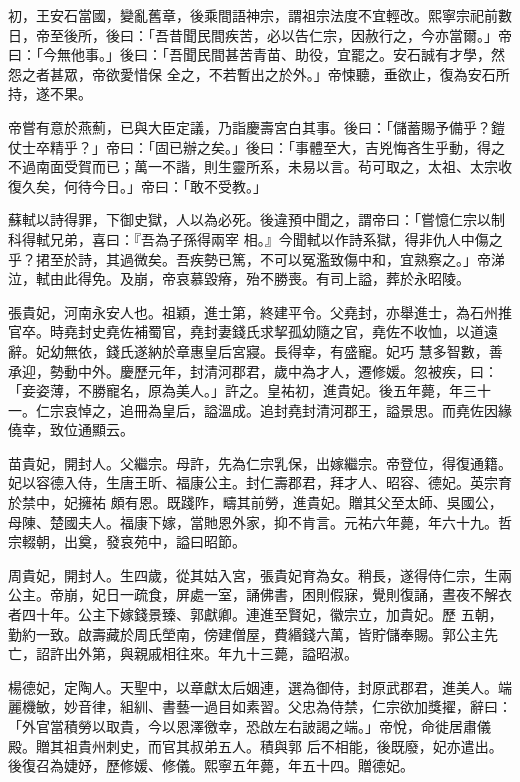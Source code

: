 \begin{pinyinscope}
 初，王安石當國，變亂舊章，後乘間語神宗，謂祖宗法度不宜輕改。熙寧宗祀前數日，帝至後所，後曰：「吾昔聞民間疾苦，必以告仁宗，因赦行之，今亦當爾。」帝曰：「今無他事。」後曰：「吾聞民間甚苦青苗、助役，宜罷之。安石誠有才學，然怨之者甚眾，帝欲愛惜保
 全之，不若暫出之於外。」帝悚聽，垂欲止，復為安石所持，遂不果。



 帝嘗有意於燕薊，已與大臣定議，乃詣慶壽宮白其事。後曰：「儲蓄賜予備乎？鎧仗士卒精乎？」帝曰：「固已辦之矣。」後曰：「事體至大，吉兇悔吝生乎動，得之不過南面受賀而已；萬一不諧，則生靈所系，未易以言。茍可取之，太祖、太宗收復久矣，何待今日。」帝曰：「敢不受教。」



 蘇軾以詩得罪，下御史獄，人以為必死。後違預中聞之，謂帝曰：「嘗憶仁宗以制科得軾兄弟，喜曰：『吾為子孫得兩宰
 相。』今聞軾以作詩系獄，得非仇人中傷之乎？捃至於詩，其過微矣。吾疾勢已篤，不可以冤濫致傷中和，宜熟察之。」帝涕泣，軾由此得免。及崩，帝哀慕毀瘠，殆不勝喪。有司上謚，葬於永昭陵。



 張貴妃，河南永安人也。祖穎，進士第，終建平令。父堯封，亦舉進士，為石州推官卒。時堯封史堯佐補蜀官，堯封妻錢氏求挈孤幼隨之官，堯佐不收恤，以道遠辭。妃幼無依，錢氏遂納於章惠皇后宮寢。長得幸，有盛寵。妃巧
 慧多智數，善承迎，勢動中外。慶歷元年，封清河郡君，歲中為才人，遷修媛。忽被疾，曰：「妾姿薄，不勝寵名，原為美人。」許之。皇祐初，進貴妃。後五年薨，年三十一。仁宗哀悼之，追冊為皇后，謚溫成。追封堯封清河郡王，謚景思。而堯佐因緣僥幸，致位通顯云。



 苗貴妃，開封人。父繼宗。母許，先為仁宗乳保，出嫁繼宗。帝登位，得復通籍。妃以容德入侍，生唐王昕、福康公主。封仁壽郡君，拜才人、昭容、德妃。英宗育於禁中，妃擁祐
 頗有恩。既踐阼，疇其前勞，進貴妃。贈其父至太師、吳國公，母陳、楚國夫人。福康下嫁，當貤恩外家，抑不肯言。元祐六年薨，年六十九。哲宗輟朝，出奠，發哀苑中，謚曰昭節。



 周貴妃，開封人。生四歲，從其姑入宮，張貴妃育為女。稍長，遂得侍仁宗，生兩公主。帝崩，妃日一疏食，屏處一室，誦佛書，困則假寐，覺則復誦，晝夜不解衣者四十年。公主下嫁錢景臻、郭獻卿。連進至賢妃，徽宗立，加貴妃。歷
 五朝，勤約一致。啟壽藏於周氏塋南，傍建僧屋，費緡錢六萬，皆貯儲奉賜。郭公主先亡，詔許出外第，與親戚相往來。年九十三薨，謚昭淑。



 楊德妃，定陶人。天聖中，以章獻太后姻連，選為御侍，封原武郡君，進美人。端麗機敏，妙音律，組紃、書藝一過目如素習。父忠為侍禁，仁宗欲加獎擢，辭曰：「外官當積勞以取貴，今以恩澤徼幸，恐啟左右詖謁之端。」帝悅，命徙居肅儀殿。贈其祖貴州刺史，而官其叔弟五人。積與郭
 后不相能，後既廢，妃亦遣出。後復召為婕妤，歷修媛、修儀。熙寧五年薨，年五十四。贈德妃。




\end{pinyinscope}
